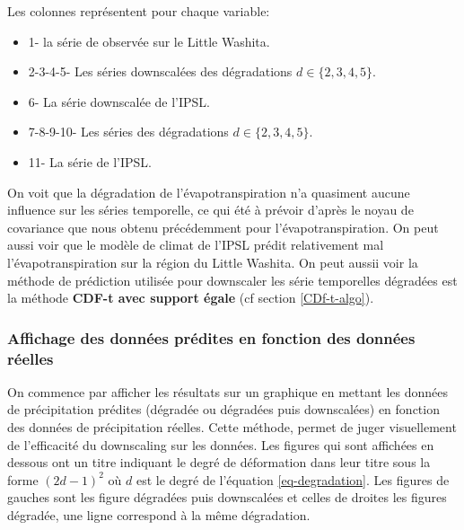 \documentclass[a4paper,11pt]{article}
\begin{document}
Les colonnes représentent pour chaque variable:
\begin{itemize}
	\item 1- la série de observée sur le Little Washita. 
	\item 2-3-4-5- Les séries downscalées des dégradations $d \in \{2,3,4,5\}$.
	\item 6- La série downscalée de l'IPSL. 
	\item 7-8-9-10- Les séries des dégradations $d \in \{2,3,4,5\}$.
	\item 11- La série de l'IPSL. 
\end{itemize}
On voit que la dégradation de l'évapotranspiration n'a quasiment aucune influence sur les séries temporelle, ce qui été à prévoir d'après le noyau de covariance que nous obtenu précédemment pour l'évapotranspiration. On peut aussi voir que le modèle de climat de l'IPSL prédit relativement mal l'évapotranspiration sur la région du Little Washita. On peut aussii voir la méthode de prédiction utilisée pour downscaler les série temporelles dégradées est la méthode  \textbf{CDF-t avec support égale} (cf section \ref{CDf-t-algo}). 

\subsubsection{Affichage des données prédites en fonction des données réelles}
\label{ch:plot-dswnsc/deg}
On commence par afficher les résultats sur un graphique en mettant les données de précipitation prédites (dégradée ou dégradées puis downscalées) en fonction des données de précipitation réelles. Cette méthode, permet de juger visuellement de l'efficacité du downscaling sur les données. Les figures qui sont affichées en dessous ont un titre indiquant le degré de déformation dans leur titre sous la forme $(2d-1)^2$ où $d$ est le degré de l'équation \eqref{eq-degradation}. Les figures de gauches sont les figure dégradées puis downscalées et celles de droites les figures dégradée, une ligne correspond à la même dégradation.	

\vspace{0.7cm}
\end{document}
